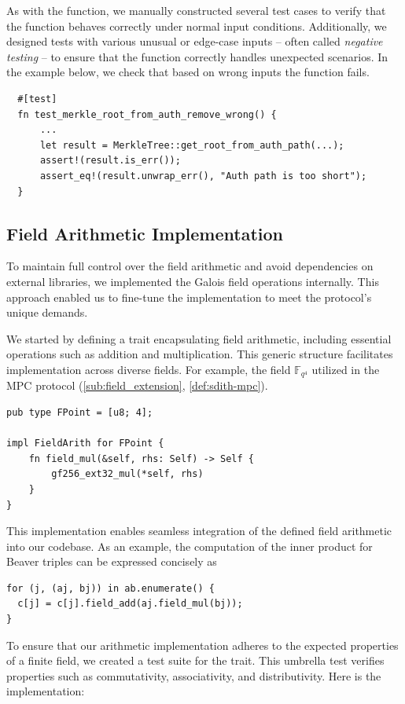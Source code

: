 \documentclass[11pt]{report}
\theoremstyle{definition}
\theoremstyle{plain}
\begin{document}
As with the  function, we manually constructed several test cases to verify that the function behaves correctly under normal input conditions. Additionally, we designed tests with various unusual or edge-case inputs -- often called \textit{negative testing} -- to ensure that the function correctly handles unexpected scenarios. In the example below, we check that based on wrong inputs the function fails.

\begin{verbatim}
  #[test]
  fn test_merkle_root_from_auth_remove_wrong() {
      ...
      let result = MerkleTree::get_root_from_auth_path(...);
      assert!(result.is_err());
      assert_eq!(result.unwrap_err(), "Auth path is too short");
  }
\end{verbatim}

\subsection{Field Arithmetic Implementation}\label{sub:field_arithmetic}
To maintain full control over the field arithmetic and avoid dependencies on external libraries,
we implemented the Galois field operations internally. This approach enabled us to fine-tune the implementation
to meet the protocol's unique demands.

We started by defining a  trait encapsulating field arithmetic, including essential operations such as addition and multiplication. This generic structure facilitates implementation across diverse fields. For example, the field $\mathbb{F}_{q^4}$ utilized in the MPC protocol (\autoref{sub:field_extension}, \autoref{def:sdith-mpc}).

\begin{verbatim}
pub type FPoint = [u8; 4];

impl FieldArith for FPoint {
    fn field_mul(&self, rhs: Self) -> Self {
        gf256_ext32_mul(*self, rhs)
    }
}
\end{verbatim}

This implementation enables seamless integration of the defined field arithmetic into our codebase.
As an example, the computation of the inner product for Beaver triples can be expressed concisely as

\begin{verbatim}
for (j, (aj, bj)) in ab.enumerate() {
  c[j] = c[j].field_add(aj.field_mul(bj));
}
\end{verbatim}

To ensure that our arithmetic implementation adheres to the expected properties of a finite field, we created a test suite for the trait. This umbrella test verifies properties such as commutativity, associativity, and distributivity. Here is the implementation:
\end{document}
